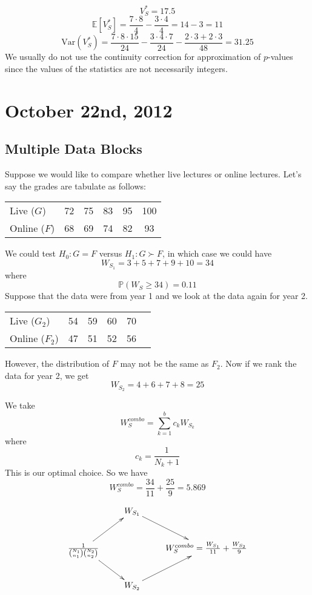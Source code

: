 \documentclass[a4paper,12pt]{amsart}
\newcommand{\Var}{\mbox{Var}}
\newcommand{\E}[1]{\mathbb{E}\left[#1\right]}
\newcommand{\p}[1]{\mathbb{P}\left(#1\right)}
\begin{document}
\[V_S^* = 17.5\]
\[\E{V_S^*} = \frac{7 \cdot 8}{4} - \frac{3 \cdot 4}{4} = 14 - 3 = 11\]
\[\Var(V_S^*) = \frac{7 \cdot 8 \cdot 15}{24} - \frac{3 \cdot 4 \cdot 7}{24} - \frac{2 \cdot 3 + 2\cdot 3}{48} = 31.25\]
We usually do not use the continuity correction for approximation of $p$-values since the values of the statistics are not necessarily integers.



\section{October 22nd, 2012}
\subsection{Multiple Data Blocks}
Suppose we would like to compare whether live lectures or online lectures. Let's say the grades are tabulate as follows:

\begin{center}
\begin{tabular}{lccccc}
\hline
Live ($G$) & 72 & 75 & 83 & 95 & 100\\
Online ($F$) & 68 & 69 & 74 & 82 & 93\\
\hline
\end{tabular}
\end{center}
We could test $H_0: G = F$ versus $H_1: G \succ F$, in which case we could have
\[W_{S_1} = 3 + 5 + 7 + 9 + 10 = 34\]
where
\[\p{W_S \geq 34} = 0.11\]
Suppose that the data were from year 1 and we look at the data again for year 2. 
\begin{center}
\begin{tabular}{lccccc}
\hline
Live ($G_2$) & 54 & 59 & 60 & 70\\
Online ($F_2$) & 47 & 51 & 52 & 56\\
\hline
\end{tabular}
\end{center}
However, the distribution of $F$ may not be the same as $F_2$.
Now if we rank the data for year 2, we get
\[W_{S_2} = 4 + 6 + 7 + 8 = 25\]

We take 
\[W_S^{combo} = \sum_{k=1}^b c_k W_{S_k}\]
where 
\[c_k = \frac{1}{N_k+1}\]
This is our optimal choice. So we have
\[W_S^{combo} = \frac{34}{11} + \frac{25}{9} = 5.869\]

\begin{displaymath}
\xymatrix{
& W_{S_1}\ar[rd] & \\
\frac{1}{{N_1 \choose n_1}{N_2 \choose n_2}}\ar[ur]\ar[dr] & & W_S^{combo} = \frac{W_{S_1}}{11} + \frac{W_{S_2}}{9}\\
& W_{S_2}\ar[ru] & 
}
\end{displaymath}
\end{document}
